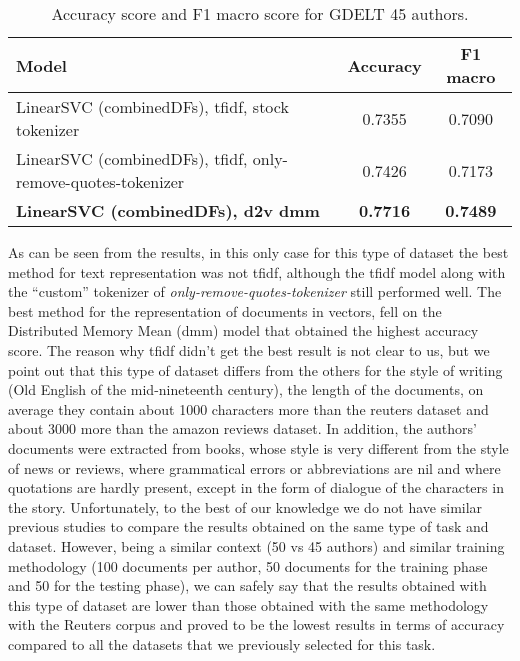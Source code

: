 \begin{table}[h!]
	\begin{center}  
		\caption[GDELT Results - 45 authors]{Accuracy score and F1 macro score for GDELT 45 authors.} 
		\label{tab:tableGDELT}
		\begin{tabular}{| p{5 cm} | c | c |}
			\hline 
			Model & Accuracy & F1 macro \\
			\hline
			LinearSVC (combinedDFs), tfidf, stock tokenizer & 0.7355 & 0.7090 \\ \hline
			LinearSVC (combinedDFs), tfidf, only-remove-quotes-tokenizer & 0.7426 & 0.7173 \\ \hline
			\textbf{LinearSVC (combinedDFs), d2v dmm} & \textbf{0.7716} & \textbf{0.7489} \\ \hline
		\end{tabular} 
	\end{center}
\end{table}

As can be seen from the results, in this only case for this type of dataset the best method for text representation was not tfidf, although the tfidf model along with the \enquote{custom} tokenizer of \textit{only-remove-quotes-tokenizer} still performed well.
The best method for the representation of documents in vectors, fell on the Distributed Memory Mean (dmm) model that obtained the highest accuracy score. 
The reason why tfidf didn't get the best result is not clear to us, but we point out that this type of dataset differs from the others for the style of writing (Old English of the mid-nineteenth century), the length of the documents, on average they contain about 1000 characters more than the reuters dataset and about 3000 more than the amazon reviews dataset.
In addition, the authors' documents were extracted from books, whose style is very different from the style of news or reviews, where grammatical errors or abbreviations are nil and where quotations are hardly present, except in the form of dialogue of the characters in the story. Unfortunately, to the best of our knowledge we do not have similar previous studies to compare the results obtained on the same type of task and dataset. However, being a similar context (50 vs 45 authors) and similar training methodology (100 documents per author, 50 documents for the training phase and 50 for the testing phase), we can safely say that the results obtained with this type of dataset are lower than those obtained with the same methodology with the Reuters corpus and proved to be the lowest results in terms of accuracy compared to all the datasets that we previously selected for this task.


